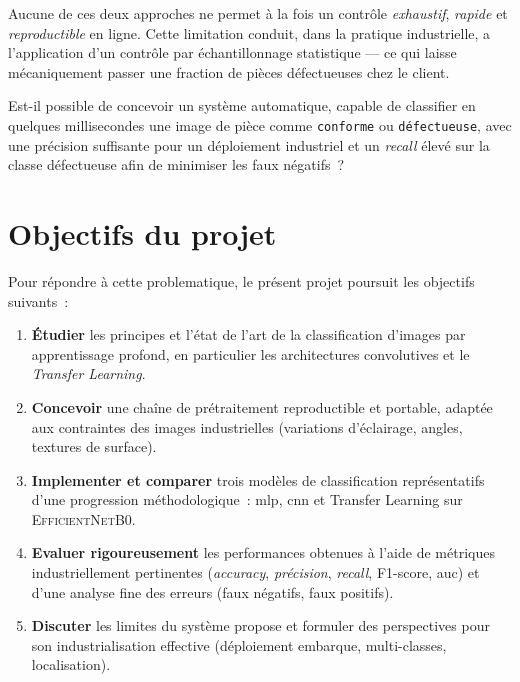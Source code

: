 \documentclass[12pt,a4paper,openany]{report}
\begin{document}
Aucune de ces deux approches ne permet à la fois un contrôle \emph{exhaustif}, \emph{rapide} et \emph{reproductible} en ligne. Cette limitation conduit, dans la pratique industrielle, a l'application d'un contrôle par échantillonnage statistique --- ce qui laisse mécaniquement passer une fraction de pièces défectueuses chez le client.

\begin{infobox}[title=Question de recherche]
Est-il possible de concevoir un système automatique, capable de classifier en quelques millisecondes une image de pièce comme \texttt{conforme} ou \texttt{défectueuse}, avec une précision suffisante pour un déploiement industriel et un \emph{recall} élevé sur la classe défectueuse afin de minimiser les faux négatifs~?
\end{infobox}

\section{Objectifs du projet}

Pour répondre à cette problematique, le présent projet poursuit les objectifs suivants~:

\begin{enumerate}
    \item \textbf{Étudier} les principes et l'état de l'art de la classification d'images par apprentissage profond, en particulier les architectures convolutives et le \emph{Transfer Learning}.
    \item \textbf{Concevoir} une chaîne de prétraitement reproductible et portable, adaptée aux contraintes des images industrielles (variations d'éclairage, angles, textures de surface).
    \item \textbf{Implementer et comparer} trois modèles de classification représentatifs d'une progression méthodologique~: \gls{mlp}, \gls{cnn} et Transfer Learning sur \textsc{EfficientNetB0}.
    \item \textbf{Evaluer rigoureusement} les performances obtenues à l'aide de métriques industriellement pertinentes (\emph{accuracy}, \emph{précision}, \emph{recall}, F1-score, \gls{auc}) et d'une analyse fine des erreurs (faux négatifs, faux positifs).
    \item \textbf{Discuter} les limites du système propose et formuler des perspectives pour son industrialisation effective (déploiement embarque, multi-classes, localisation).
\end{enumerate}
\end{document}

